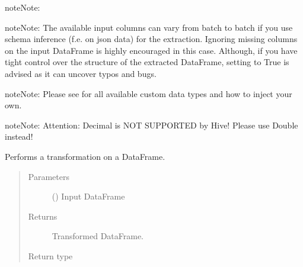 \documentclass[a4paper,10pt, twoside,english]{sphinxmanual}
\begin{document}
\begin{fulllineitems}
\begin{sphinxadmonition}{note}{Note:}
\begin{itemize}
\begin{description}
\end{description}

\end{itemize}
\end{sphinxadmonition}

\begin{sphinxadmonition}{note}{Note:}
The available input columns can vary from batch to batch if you use schema inference
(f.e. on json data) for the extraction. Ignoring missing columns on the input DataFrame is
highly encouraged in this case. Although, if you have tight control over the structure
of the extracted DataFrame, setting  to True is advised
as it can uncover typos and bugs.
\end{sphinxadmonition}

\begin{sphinxadmonition}{note}{Note:}
Please see {\hyperref[\detokenize{transformer/mapper:module-spooq2.transformer.mapper_custom_data_types}]{}} for all available custom
data types and how to inject your own.
\end{sphinxadmonition}

\begin{sphinxadmonition}{note}{Note:}
Attention: Decimal is NOT SUPPORTED by Hive! Please use Double instead!
\end{sphinxadmonition}

\begin{fulllineitems}
\label{\detokenize{transformer/mapper:spooq2.transformer.mapper.Mapper.transform}}
Performs a transformation on a DataFrame.
\begin{quote}\begin{description}
\item[{Parameters}] \leavevmode
{} () \textendash{} Input DataFrame

\item[{Returns}] \leavevmode
Transformed DataFrame.

\item[{Return type}] \leavevmode
{}


\end{description}
\end{quote}
\end{fulllineitems}
\end{fulllineitems}
\end{document}
